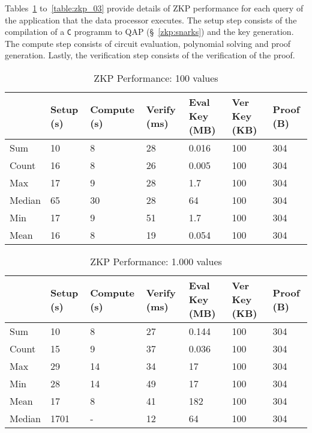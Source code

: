 Tables~\ref{table:zkp_01} to~\ref{table:zkp_03} provide details of ZKP performance for each query of the application that the data processor executes. The setup step consists of the compilation of a \verb|C| programm to QAP (§~\ref{zkp:snarks}) and the key generation. The compute step consists of circuit evaluation, polynomial solving and proof generation. Lastly, the verification step consists of the verification of the proof.

\begin{table}[!htb]
\centering
\begin{tabular}{|l|l|l|l|l|l|l|}
\hline
 & Setup (s) & Compute (s) & Verify (ms) & Eval Key (MB) & Ver Key (KB) & Proof (B)  \\ \hline
 Sum & 10 & 8 & 28 & 0.016 & 100 & 304 \\ \hline
 Count & 16 & 8 & 26 & 0.005 & 100 & 304 \\ \hline
 Max & 17 & 9 & 28 & 1.7 & 100 & 304 \\ \hline
 Median & 65 & 30 & 28 & 64 & 100 & 304 \\ \hline
 Min & 17 & 9 & 51 & 1.7 & 100 & 304 \\ \hline
 Mean & 16 & 8 & 19 & 0.054 & 100 & 304 \\ \hline
\end{tabular}
\captionsetup{format=hang, justification=centering}
\caption{ZKP Performance: 100 values}
\label{table:zkp_01}
\end{table}

\begin{table}[!htb]
\centering
\begin{tabular}{|l|l|l|l|l|l|l|}
\hline
 & Setup (s) & Compute (s) & Verify (ms) & Eval Key (MB) & Ver Key (KB) & Proof (B)  \\ \hline
 Sum & 10 & 8 & 27 & 0.144 & 100 & 304 \\ \hline
 Count & 15 & 9 & 37 & 0.036 & 100 & 304 \\ \hline
 Max & 29 & 14 & 34 & 17 & 100 & 304 \\ \hline
 Min & 28 & 14 & 49 & 17 & 100 & 304 \\ \hline
 Mean & 17 & 8 & 41 & 182 & 100 & 304 \\ \hline
 Median & 1701 & - & 12 & 64 & 100 & 304 \\ \hline
\end{tabular}
\captionsetup{format=hang, justification=centering}
\caption{ZKP Performance: 1.000 values}
\label{table:zkp_02}
\end{table}

